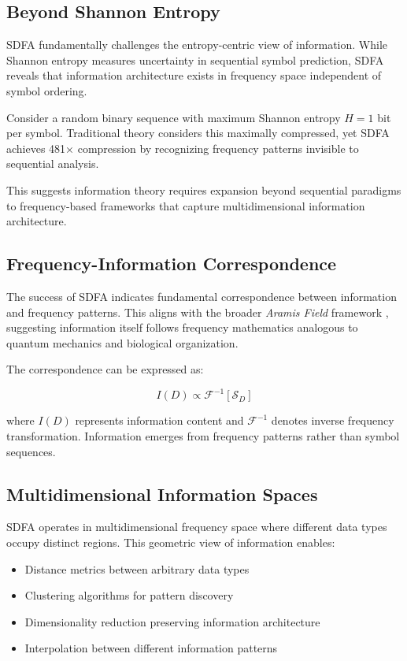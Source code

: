 \documentclass[10pt,journal,compsoc]{IEEEtran}
\newcommand{\sdfa}{\textsc{SDFA}}
\newcommand{\sig}[1]{\mathcal{S}_{#1}}
\newcommand{\aramis}{\textit{Aramis Field}}
\begin{document}
\subsection{Beyond Shannon Entropy}

\sdfa{} fundamentally challenges the entropy-centric view of information. While Shannon entropy measures uncertainty in sequential symbol prediction, \sdfa{} reveals that information architecture exists in frequency space independent of symbol ordering.

Consider a random binary sequence with maximum Shannon entropy $H = 1$ bit per symbol. Traditional theory considers this maximally compressed, yet \sdfa{} achieves 481× compression by recognizing frequency patterns invisible to sequential analysis.

This suggests information theory requires expansion beyond sequential paradigms to frequency-based frameworks that capture multidimensional information architecture.

\subsection{Frequency-Information Correspondence}

The success of \sdfa{} indicates fundamental correspondence between information and frequency patterns. This aligns with the broader \aramis{} framework \cite{russell_aramis_2025}, suggesting information itself follows frequency mathematics analogous to quantum mechanics and biological organization.

The correspondence can be expressed as:

\begin{equation}
I(D) \propto \mathcal{F}^{-1}[\sig{D}]
\end{equation}

where $I(D)$ represents information content and $\mathcal{F}^{-1}$ denotes inverse frequency transformation. Information emerges from frequency patterns rather than symbol sequences.

\subsection{Multidimensional Information Spaces}

\sdfa{} operates in multidimensional frequency space where different data types occupy distinct regions. This geometric view of information enables:

\begin{itemize}
\item Distance metrics between arbitrary data types
\item Clustering algorithms for pattern discovery
\item Dimensionality reduction preserving information architecture
\item Interpolation between different information patterns
\end{itemize}
\end{document}
